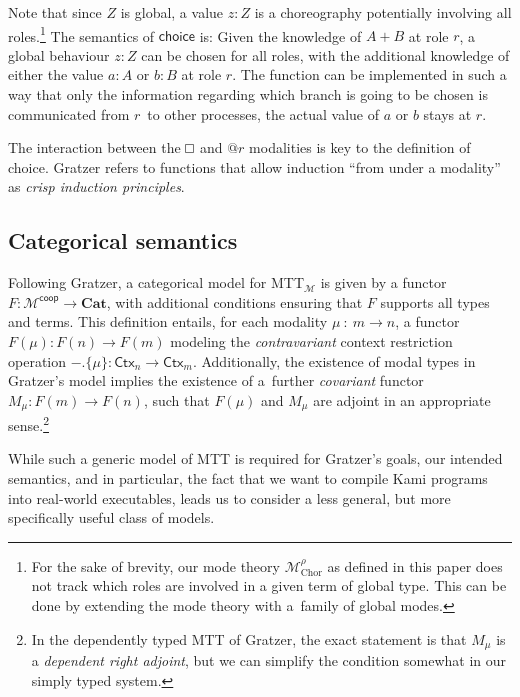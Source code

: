 \documentclass{scrartcl}
\renewcommand{\square}{\mathop{\mathchoice%
  {\tikz{\draw (0,0) rectangle (0.2cm,0.2cm);}}%
  {\tikz{\draw (0,0) rectangle (0.2cm,0.2cm);}}%
  {\tikz{\draw (0,0) rectangle (0.15cm,0.15cm);}}%
  {\tikz{\draw (0,0) rectangle (0.10cm,0.10cm);}}}}
\theoremstyle{definition}
\theoremstyle{plain}
\newcommand{\MTTM}{MTT${}_{\mathcal{M}}$}
\begin{document}
Note that since $Z$ is global, a value $z : Z$ is a choreography potentially
involving all roles.\footnote{For the sake of brevity, our mode theory
  $\mathcal{M}^{\rho}_{\textrm{Chor}}$ as defined in this paper does not track
  which roles are involved in a given term of global type. This can be done by
  extending the mode theory with a~family of global modes.}
The semantics of $\textsf{choice}$ is: Given the knowledge of $A + B$ at role
$r$, a global behaviour $z : Z$ can be chosen for all roles, with the
additional knowledge of either the value $a : A$ or $b : B$ at role $r$. The
function can be implemented in such a way that only the information regarding
which branch is going to be chosen is communicated from $r$~to other processes,
the actual value of $a$ or $b$ stays at $r$.

The interaction between the $\square$ and $@r$ modalities is key to the
definition of \textsf{choice}. Gratzer refers to functions that allow induction
``from under a modality'' as \emph{crisp induction
principles}\cite[§6.3.1]{gratzer2023syntax}.



\subsection{Categorical semantics}
Following Gratzer, a categorical model for \MTTM{} is given by a functor $F :
\mathcal{M}^{\textsf{coop}} \to \textbf{Cat}$, with additional conditions
ensuring that $F$ supports all types and terms. This definition entails, for
each modality $\mu~:~m \to n$, a functor $F(\mu) : F(n) \to F(m)$ modeling the
\emph{contravariant} context restriction operation ${-}.\{\mu\} :
\textsf{Ctx}_n \to \textsf{Ctx}_m$. Additionally, the existence of modal types
in Gratzer's model implies the existence of a~further \emph{covariant} functor
$M_\mu : F(m) \to F(n)$, such that $F(\mu)$ and $M_\mu$ are adjoint in an
appropriate sense.\footnote{In the dependently typed MTT of Gratzer, the exact
  statement is that $M_\mu$ is a \emph{dependent right adjoint}, but we can
  simplify the condition somewhat in our simply typed system.}

While such a generic model of MTT is required for Gratzer's goals, our intended
semantics, and in particular, the fact that we want to compile Kami programs
into real-world executables, leads us to consider a less general, but more
specifically useful class of models.
\end{document}
